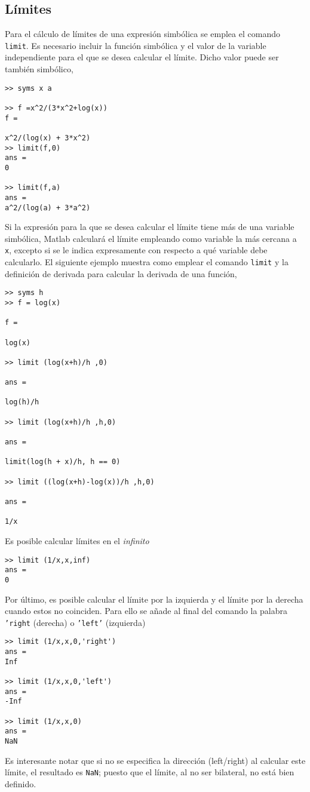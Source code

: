 \subsection{Límites} 
Para el cálculo de límites de una expresión simbólica se emplea el comando \texttt{limit}. Es necesario incluir la función simbólica y el valor de la variable independiente para el que se desea calcular el límite.  Dicho valor puede ser también simbólico,

\begin{verbatim}
>> syms x a

>> f =x^2/(3*x^2+log(x))
f =
 
x^2/(log(x) + 3*x^2)
>> limit(f,0)
ans = 
0
 
>> limit(f,a) 
ans = 
a^2/(log(a) + 3*a^2)

\end{verbatim}
Si la expresión para la que se desea calcular el límite tiene más de una variable simbólica, Matlab calculará el límite empleando como variable la más cercana a \texttt{x}, excepto si se le indica expresamente con respecto a qué variable debe calcularlo. El siguiente ejemplo muestra como emplear el comando \texttt{limit} y la definición de derivada para calcular la derivada de una función,

\begin{verbatim} 
>> syms h 
>> f = log(x)
 
f =
 
log(x)
 
>> limit (log(x+h)/h ,0)
 
ans =
 
log(h)/h
 
>> limit (log(x+h)/h ,h,0)
 
ans =
 
limit(log(h + x)/h, h == 0)
 
>> limit ((log(x+h)-log(x))/h ,h,0)
 
ans =
 
1/x
\end{verbatim}

Es posible calcular límites en el \emph{infinito}
\begin{verbatim}
>> limit (1/x,x,inf) 
ans = 
0
\end{verbatim}

Por último, es posible calcular el límite por la izquierda y el límite por la derecha cuando estos no coinciden. Para ello se añade al final del comando la palabra \texttt{'right} (derecha) o \texttt{'left'} (izquierda)
\begin{verbatim}
>> limit (1/x,x,0,'right') 
ans = 
Inf
 
>> limit (1/x,x,0,'left') 
ans = 
-Inf
 
>> limit (1/x,x,0) 
ans = 
NaN
\end{verbatim}
Es interesante notar que si no se especifica la dirección (left/right) al calcular este límite, el resultado es \texttt{NaN}; puesto que el límite, al no ser bilateral, no está bien definido.

